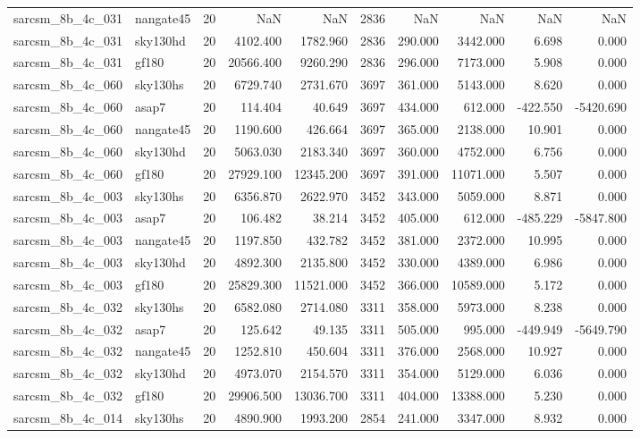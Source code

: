 \begin{longtable}{llrrrrrrrr}
sarcsm\_8b\_4c\_031 & nangate45 & 20 & NaN & NaN & 2836 & NaN & NaN & NaN & NaN \\
sarcsm\_8b\_4c\_031 & sky130hd & 20 & 4102.400 & 1782.960 & 2836 & 290.000 & 3442.000 & 6.698 & 0.000 \\
sarcsm\_8b\_4c\_031 & gf180 & 20 & 20566.400 & 9260.290 & 2836 & 296.000 & 7173.000 & 5.908 & 0.000 \\
sarcsm\_8b\_4c\_060 & sky130hs & 20 & 6729.740 & 2731.670 & 3697 & 361.000 & 5143.000 & 8.620 & 0.000 \\
sarcsm\_8b\_4c\_060 & asap7 & 20 & 114.404 & 40.649 & 3697 & 434.000 & 612.000 & -422.550 & -5420.690 \\
sarcsm\_8b\_4c\_060 & nangate45 & 20 & 1190.600 & 426.664 & 3697 & 365.000 & 2138.000 & 10.901 & 0.000 \\
sarcsm\_8b\_4c\_060 & sky130hd & 20 & 5063.030 & 2183.340 & 3697 & 360.000 & 4752.000 & 6.756 & 0.000 \\
sarcsm\_8b\_4c\_060 & gf180 & 20 & 27929.100 & 12345.200 & 3697 & 391.000 & 11071.000 & 5.507 & 0.000 \\
sarcsm\_8b\_4c\_003 & sky130hs & 20 & 6356.870 & 2622.970 & 3452 & 343.000 & 5059.000 & 8.871 & 0.000 \\
sarcsm\_8b\_4c\_003 & asap7 & 20 & 106.482 & 38.214 & 3452 & 405.000 & 612.000 & -485.229 & -5847.800 \\
sarcsm\_8b\_4c\_003 & nangate45 & 20 & 1197.850 & 432.782 & 3452 & 381.000 & 2372.000 & 10.995 & 0.000 \\
sarcsm\_8b\_4c\_003 & sky130hd & 20 & 4892.300 & 2135.800 & 3452 & 330.000 & 4389.000 & 6.986 & 0.000 \\
sarcsm\_8b\_4c\_003 & gf180 & 20 & 25829.300 & 11521.000 & 3452 & 366.000 & 10589.000 & 5.172 & 0.000 \\
sarcsm\_8b\_4c\_032 & sky130hs & 20 & 6582.080 & 2714.080 & 3311 & 358.000 & 5973.000 & 8.238 & 0.000 \\
sarcsm\_8b\_4c\_032 & asap7 & 20 & 125.642 & 49.135 & 3311 & 505.000 & 995.000 & -449.949 & -5649.790 \\
sarcsm\_8b\_4c\_032 & nangate45 & 20 & 1252.810 & 450.604 & 3311 & 376.000 & 2568.000 & 10.927 & 0.000 \\
sarcsm\_8b\_4c\_032 & sky130hd & 20 & 4973.070 & 2154.570 & 3311 & 354.000 & 5129.000 & 6.036 & 0.000 \\
sarcsm\_8b\_4c\_032 & gf180 & 20 & 29906.500 & 13036.700 & 3311 & 404.000 & 13388.000 & 5.230 & 0.000 \\
sarcsm\_8b\_4c\_014 & sky130hs & 20 & 4890.900 & 1993.200 & 2854 & 241.000 & 3347.000 & 8.932 & 0.000 \\

\end{longtable}
